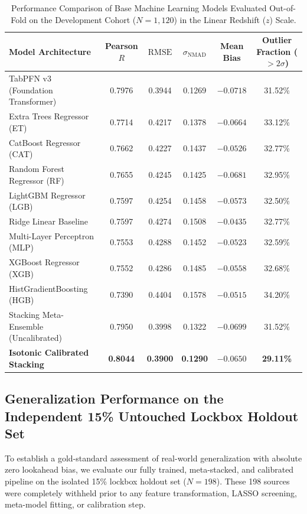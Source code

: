 \documentclass[twocolumn,linenumbers,floatfix]{aastex701}
\begin{document}
\begin{table}[t!]
\centering
\caption{Performance Comparison of Base Machine Learning Models Evaluated Out-of-Fold on the Development Cohort ($N=1{,}120$) in the Linear Redshift ($z$) Scale.}
\label{tab:model_comparison}
\renewcommand{\arraystretch}{1.15}
\setlength{\tabcolsep}{12pt}
\small
\begin{tabular}{lccccc}
\hline\hline
Model Architecture & Pearson $R$ & $\mathrm{RMSE}$ & $\sigma_{\mathrm{NMAD}}$ & Mean Bias & Outlier Fraction ($>2\sigma$) \\
\hline
TabPFN v3 (Foundation Transformer) & 0.7976 & 0.3944 & 0.1269 & $-0.0718$ & 31.52\% \\
Extra Trees Regressor (ET) & 0.7714 & 0.4217 & 0.1378 & $-0.0664$ & 33.12\% \\
CatBoost Regressor (CAT) & 0.7662 & 0.4227 & 0.1437 & $-0.0526$ & 32.77\% \\
Random Forest Regressor (RF) & 0.7655 & 0.4245 & 0.1425 & $-0.0681$ & 32.95\% \\
LightGBM Regressor (LGB) & 0.7597 & 0.4254 & 0.1458 & $-0.0573$ & 32.50\% \\
Ridge Linear Baseline & 0.7597 & 0.4274 & 0.1508 & $-0.0435$ & 32.77\% \\
Multi-Layer Perceptron (MLP) & 0.7553 & 0.4288 & 0.1452 & $-0.0523$ & 32.59\% \\
XGBoost Regressor (XGB) & 0.7552 & 0.4286 & 0.1485 & $-0.0558$ & 32.68\% \\
HistGradientBoosting (HGB) & 0.7390 & 0.4404 & 0.1578 & $-0.0515$ & 34.20\% \\
\hline
Stacking Meta-Ensemble (Uncalibrated) & 0.7950 & 0.3998 & 0.1322 & $-0.0699$ & 31.52\% \\
\textbf{Isotonic Calibrated Stacking} & \textbf{0.8044} & \textbf{0.3900} & \textbf{0.1290} & \textbf{$-0.0650$} & \textbf{29.11\%} \\
\hline
\end{tabular}
\end{table}

\subsection{Generalization Performance on the Independent 15\% Untouched Lockbox Holdout Set}
\label{subsec:lockbox_evaluation}

To establish a gold-standard assessment of real-world generalization with absolute zero lookahead bias, we evaluate our fully trained, meta-stacked, and calibrated pipeline on the isolated 15\% lockbox holdout set ($N = 198$). These 198 sources were completely withheld prior to any feature transformation, LASSO screening, meta-model fitting, or calibration step.
\end{document}
